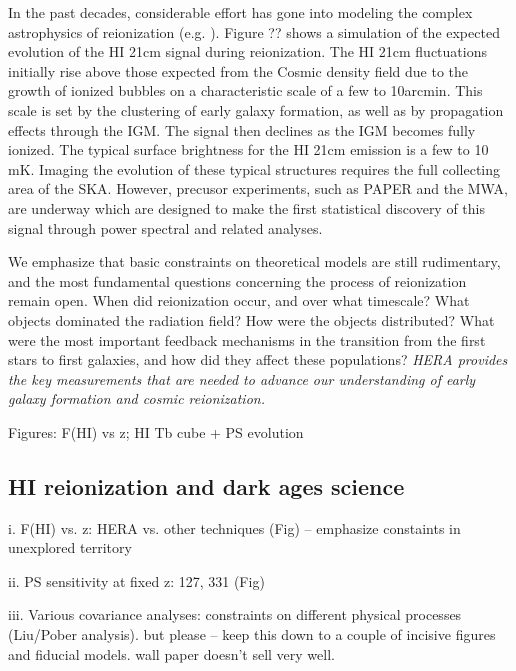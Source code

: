 \documentclass[preprint]{aastex}
\begin{document}
In the past decades, considerable effort has gone into modeling the
complex astrophysics of reionization
(e.g. \citealt{shapiro_giroux1987, haiman_loeb1997,
furlanetto_et_al2004, santos_et_al2010}). Figure ?? shows a simulation
of the expected evolution of the HI 21cm signal during
reionization. The HI 21cm fluctuations initially rise above those
expected from the Cosmic density field due to the growth of ionized
bubbles on a characteristic scale of a few to 10arcmin. This scale is
set by the clustering of early galaxy formation, as well as by
propagation effects through the IGM. The signal then declines as the
IGM becomes fully ionized.  The typical surface brightness for the HI
21cm emission is a few to 10 mK.  Imaging the evolution of these
typical structures requires the full collecting area of the
SKA. However, precusor experiments, such as PAPER and the MWA, are
underway which are designed to make the first statistical discovery of
this signal through power spectral and related analyses.

We emphasize that basic constraints on theoretical models are still
rudimentary, and the most fundamental questions concerning the process
of reionization remain open.  When did reionization occur, and over
what timescale?  What objects dominated the radiation field?  How were
the objects distributed?  What were the most important feedback
mechanisms in the transition from the first stars to first galaxies,
and how did they affect these populations?  {\it HERA provides the key
measurements that are needed to advance our understanding of early
galaxy formation and cosmic reionization.}

Figures: F(HI) vs z;  HI Tb cube + PS evolution


\subsection{HI reionization and dark ages science} %

i. F(HI) vs. z: HERA vs. other techniques (Fig) -- emphasize constaints in unexplored territory

ii. PS sensitivity at fixed z: 127, 331 (Fig)

iii. Various covariance analyses: constraints on different physical processes (Liu/Pober analysis). but
please -- keep this down to a couple of incisive figures and fiducial models. wall paper doesn't sell very well. 
\end{document}
